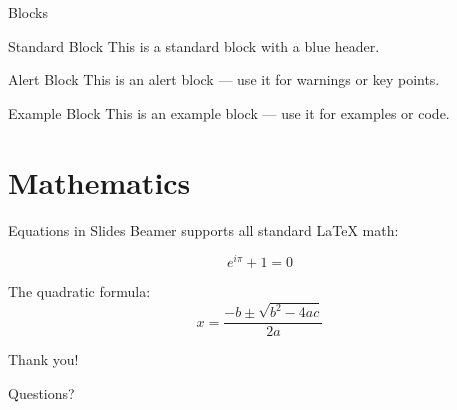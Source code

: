 \documentclass[aspectratio=169]{beamer}
\begin{document}
\begin{frame}{Blocks}
\begin{block}{Standard Block}
    This is a standard block with a blue header.
\end{block}

\begin{alertblock}{Alert Block}
    This is an alert block --- use it for warnings or key points.
\end{alertblock}

\begin{exampleblock}{Example Block}
    This is an example block --- use it for examples or code.
\end{exampleblock}
\end{frame}

\section{Mathematics}

\begin{frame}{Equations in Slides}
Beamer supports all standard \LaTeX{} math:

\begin{equation}
    e^{i\pi} + 1 = 0
\end{equation}

The quadratic formula:
\begin{equation}
    x = \frac{-b \pm \sqrt{b^2 - 4ac}}{2a}
\end{equation}
\end{frame}

\begin{frame}{}
\centering
\Huge Thank you!

\vspace{1cm}
\normalsize Questions?
\end{frame}
\end{document}
